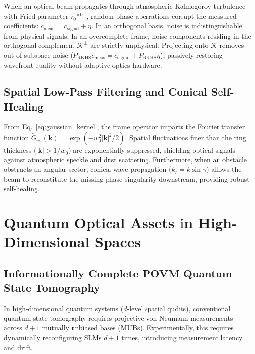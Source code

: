 \documentclass[11pt,a4paper]{article}
\begin{document}
When an optical beam propagates through atmospheric Kolmogorov turbulence with Fried parameter $r_0^{\text{turb}}$~\cite{Fried1966,Kolmogorov1941}, random phase aberrations corrupt the measured coefficients: $c_{\text{meas}} = c_{\text{signal}} + \eta$. In an orthogonal basis, noise is indistinguishable from physical signals. In an overcomplete frame, noise components residing in the orthogonal complement $\mathcal{K}^\perp$ are strictly unphysical. Projecting onto $\mathcal{K}$ removes out-of-subspace noise ($P_{\text{RKHS}} c_{\text{meas}} = c_{\text{signal}} + P_{\text{RKHS}} \eta$), passively restoring wavefront quality without adaptive optics hardware.

\subsection{Spatial Low-Pass Filtering and Conical Self-Healing}

From Eq.~\eqref{eq:gaussian_kernel}, the frame operator imparts the Fourier transfer function $\widetilde{G}_{w_0}(\mathbf{k}) = \exp(-w_0^2 |\mathbf{k}|^2 / 2)$. Spatial fluctuations finer than the ring thickness ($|\mathbf{k}| > 1/w_0$) are exponentially suppressed, shielding optical signals against atmospheric speckle and dust scattering. Furthermore, when an obstacle obstructs an angular sector, conical wave propagation ($k_r = k \sin\gamma$) allows the beam to reconstitute the missing phase singularity downstream, providing robust self-healing.

\section{Quantum Optical Assets in High-Dimensional Spaces}
\label{sec:quantum_assets}

\subsection{Informationally Complete POVM Quantum State Tomography}

In high-dimensional quantum systems ($d$-level spatial qudits), conventional quantum state tomography requires projective von Neumann measurements across $d+1$ mutually unbiased bases (MUBs). Experimentally, this requires dynamically reconfiguring SLMs $d+1$ times, introducing measurement latency and drift.
\end{document}
